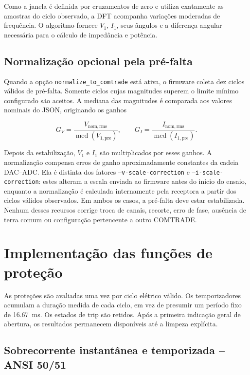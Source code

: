 Como a janela é definida por cruzamentos de zero e utiliza exatamente as amostras do ciclo observado, a DFT acompanha variações moderadas de frequência. O algoritmo fornece $V_1$, $I_1$, seus ângulos e a diferença angular necessária para o cálculo de impedância e potência.

\subsection{Normalização opcional pela pré-falta}

Quando a opção \texttt{normalize\_to\_comtrade} está ativa, o firmware coleta dez ciclos válidos de pré-falta. Somente ciclos cujas magnitudes superem o limite mínimo configurado são aceitos. A mediana das magnitudes é comparada aos valores nominais do JSON, originando os ganhos

\begin{equation}
  G_V=\frac{V_{\mathrm{nom,rms}}}{\operatorname{med}(V_{1,\mathrm{pre}})}, \qquad
  G_I=\frac{I_{\mathrm{nom,rms}}}{\operatorname{med}(I_{1,\mathrm{pre}})}.
\end{equation}

Depois da estabilização, $V_1$ e $I_1$ são multiplicados por esses ganhos. A normalização compensa erros de ganho aproximadamente constantes da cadeia DAC--ADC. Ela é distinta dos fatores \texttt{--v-scale-correction} e \texttt{--i-scale-correction}: estes alteram a escala enviada ao firmware antes do início do ensaio, enquanto a normalização é calculada internamente pela receptora a partir dos ciclos válidos observados. Em ambos os casos, a pré-falta deve estar estabilizada. Nenhum desses recursos corrige troca de canais, recorte, erro de fase, ausência de terra comum ou configuração pertencente a outro COMTRADE.

\section{Implementação das funções de proteção}

As proteções são avaliadas uma vez por ciclo elétrico válido. Os temporizadores acumulam a duração medida de cada ciclo, em vez de presumir um período fixo de \SI{16,67}{\milli\second}. Os estados de trip são retidos. Após a primeira indicação geral de abertura, os resultados permanecem disponíveis até a limpeza explícita.

\subsection{Sobrecorrente instantânea e temporizada -- ANSI 50/51}


